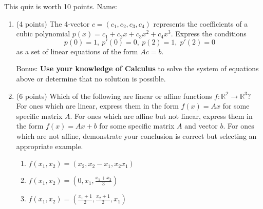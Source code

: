 \documentclass[11pt,fleqn]{article}
\begin{document}
\renewcommand{\headrulewidth}{0pt}
\newcommand{\blank}[1]{\rule{#1}{0.75pt}}
\renewcommand{\d}{\displaystyle}
This quiz is worth 10 points. \hfill {\Large{Name: \underline{\hspace{2in}}}}
\begin{enumerate}
\item (4 points) The 4-vector $c=(c_1,c_2,c_3,c_4)$ represents the coefficients of a cubic polynomial $p(x)=c_1+c_2x+c_3x^2+c_4x^3.$ Express the conditions 
$$p(0)=1, \: p'(0)=0, \: p(2)=1, \; p'(2)=0$$
as a set of linear equations of the form $Ac=b.$

\vfill
Bonus: \textbf{Use your knowledge of Calculus} to solve the system of equations above or determine that no solution is possible.\\

\vspace{1in}

\newpage
\item (6 points) Which of the following are linear or affine functions $f: \mathbb{R^2} \to \mathbb{R}^3$? For ones which are linear, express them in the form $f(x)=Ax$ for some specific matrix $A.$ For ones which are affine but not linear, express them in the form $f(x) = Ax+b$ for some specific matrix $A$ and vector $b$. For ones which are not affine, demonstrate your conclusion is correct but selecting an appropriate example.\\

	\begin{enumerate}
	\item $f(x_1,x_2)=(x_2,x_2-x_1,x_2x_1)$
	\vfill
	\item  $f(x_1,x_2)=(0,x_1,\frac{x_1+x_2}{3})$
	\vfill
	\item  $f(x_1,x_2)=(\frac{x_1+1}{2},\frac{x_2+1}{2}, x_1)$
	\vfill
	\end{enumerate}
\end{enumerate}
\end{document}
